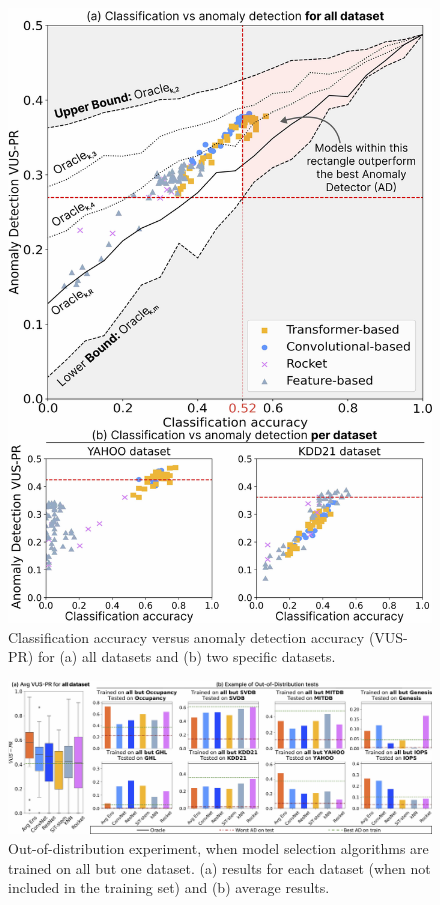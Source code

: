 \begin{figure}
    \centering
    \includegraphics[width=0.85\linewidth]{figures/10_class_AD.jpg}
    \vspace{-0.3cm}
    \caption{Classification accuracy versus anomaly detection accuracy (VUS-PR) for (a) all datasets and (b) two specific datasets.}
    \vspace{-0.3cm}
    \label{fig:class_AD}
\end{figure}


\begin{figure}
    \centering
    \includegraphics[width=0.90\linewidth]{figures/11_one_vs_all.jpg}
    \vspace{-0.3cm}
    \caption{Out-of-distribution experiment, when model selection algorithms are trained on all but one dataset. (a) results for each dataset (when not included in the training set) and (b) average results.
    }
    \vspace{-0.3cm}
    \label{fig:on_vs_all}
\end{figure}

